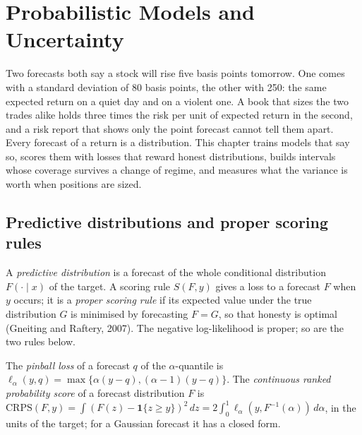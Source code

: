 \chapter{Probabilistic Models and Uncertainty}\label{ch:ml:probabilistic-models-and-uncertainty}

Two forecasts both say a stock will rise five basis points tomorrow. One comes with a standard deviation of 80 basis
points, the other with 250: the same expected return on a quiet day and on a violent one. A book that sizes the two
trades alike holds three times the risk per unit of expected return in the second, and a risk report that shows only
the point forecast cannot tell them apart. Every forecast of a return is a distribution. This chapter trains models
that say so, scores them with losses that reward honest distributions, builds intervals whose coverage survives a
change of regime, and measures what the variance is worth when positions are sized.

\section{Predictive distributions and proper scoring rules}

\begin{definition}\label{def:ml:probabilistic-models-and-uncertainty:scoring}
A \emph{predictive distribution} is a forecast of the whole conditional distribution
$F(\cdot\mid x)$ of the target. A scoring rule $S(F, y)$ gives a loss to a forecast $F$ when $y$ occurs; it is a
\emph{proper scoring rule} if its expected value under the true distribution $G$ is minimised
by forecasting $F = G$, so that honesty is optimal (Gneiting and Raftery, 2007). The negative log-likelihood is proper;
so are the two rules below.
\end{definition}

\begin{definition}\label{def:ml:probabilistic-models-and-uncertainty:crps}
The \emph{pinball loss} of a forecast $q$ of the $\alpha$-quantile is
$\ell_\alpha(y, q) = \max\{\alpha(y - q), (\alpha - 1)(y - q)\}$. The \emph{continuous ranked probability
score} of a forecast distribution $F$ is
$\mathrm{CRPS}(F, y) = \int(F(z) - \mathbf 1\{z\ge y\})^2\,dz = 2\int_0^1\ell_\alpha(y, F^{-1}(\alpha))\,d\alpha$, in the
units of the target; for a Gaussian forecast it has a closed form.
\end{definition}

